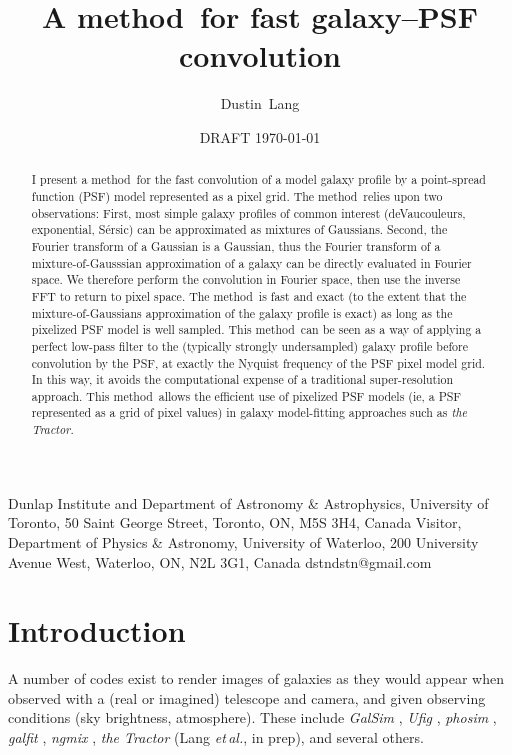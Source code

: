 \documentclass[11pt,preprint]{aastex}
\newcommand{\foreign}[1]{\emph{#1}}
\newcommand{\etal}{\foreign{et\,al.}}
\newcommand{\project}[1]{\textsl{#1}}
\newcommand{\trick}{method}
\begin{document}
\title{A \trick\ for fast galaxy--PSF convolution}
\author{Dustin~Lang}
%
{Dunlap Institute and Department of Astronomy \& Astrophysics,
  University of Toronto,
  50 Saint George Street, Toronto, ON, M5S 3H4, Canada}
%
{Visitor, Department of Physics \& Astronomy,
  University of Waterloo,
  200 University Avenue West,
  Waterloo, ON, N2L 3G1, Canada}
%
{dstndstn@gmail.com}
\date{DRAFT \today}

\begin{abstract}
  I present a \trick\ for the fast convolution of a model galaxy
  profile by a point-spread function (PSF) model 
  represented as a pixel grid.
  The \trick\ relies upon two
  observations: First, most simple galaxy profiles of common interest
  (deVaucouleurs, exponential, S\'ersic) can be approximated as
  mixtures of Gaussians.  Second, the Fourier transform of a Gaussian
  is a Gaussian, thus the Fourier transform of a mixture-of-Gausssian
  approximation of a galaxy can be directly evaluated in Fourier
  space.
  We therefore perform the convolution in Fourier space, then
  use the inverse FFT to return to pixel space.
  The \trick\ is fast and exact (to the extent that the mixture-of-Gaussians
  approximation of the galaxy profile is exact) as long as the pixelized PSF
  model is well sampled.
  This \trick\ can be seen as a way of applying a perfect low-pass filter to
  the (typically strongly undersampled) galaxy profile before convolution by
  the PSF, at exactly the Nyquist frequency of the PSF pixel model grid.  In
  this way, it avoids the computational expense of a traditional super-resolution
  approach.
  This \trick\ allows
  the efficient use of pixelized PSF models (ie, a PSF represented as
  a grid of pixel values) in galaxy model-fitting approaches such as
  \project{the Tractor}.
\end{abstract}

\section{Introduction}

A number of codes exist to render images of galaxies as they would
appear when observed with a (real or imagined) telescope and camera,
and given observing conditions (sky brightness, atmosphere).  These
include \project{GalSim} \citep{galsim}, \project{Ufig} \citep{ufig},
\project{phosim} \citep{phosim}, \project{galfit} \citep{galfit}, 
\project{ngmix} \citep{ngmix},
\project{the Tractor} (Lang \etal, in prep), and several others.
\end{document}
